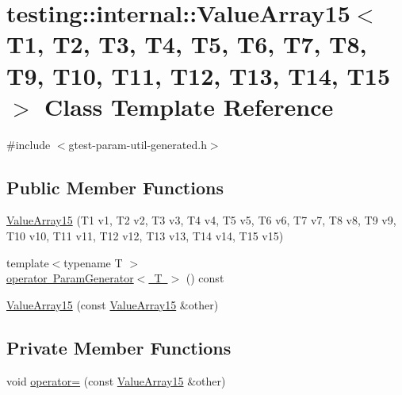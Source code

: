 \hypertarget{classtesting_1_1internal_1_1_value_array15}{}\section{testing\+::internal\+::Value\+Array15$<$ T1, T2, T3, T4, T5, T6, T7, T8, T9, T10, T11, T12, T13, T14, T15 $>$ Class Template Reference}
\label{classtesting_1_1internal_1_1_value_array15}


{\ttfamily \#include $<$gtest-\/param-\/util-\/generated.\+h$>$}

\subsection*{Public Member Functions}
\begin{DoxyCompactItemize}
\item 
\mbox{\hyperlink{classtesting_1_1internal_1_1_value_array15_a2f9c6670b744cb08587bea1b50e169b4}{Value\+Array15}} (T1 v1, T2 v2, T3 v3, T4 v4, T5 v5, T6 v6, T7 v7, T8 v8, T9 v9, T10 v10, T11 v11, T12 v12, T13 v13, T14 v14, T15 v15)
\item 
{\footnotesize template$<$typename T $>$ }\\\mbox{\hyperlink{classtesting_1_1internal_1_1_value_array15_ab5a77c335c83ef3f99e3133c2213c495}{operator Param\+Generator$<$ T $>$}} () const
\item 
\mbox{\hyperlink{classtesting_1_1internal_1_1_value_array15_ab08ee6de70a42bc580229cc32635fa5c}{Value\+Array15}} (const \mbox{\hyperlink{classtesting_1_1internal_1_1_value_array15}{Value\+Array15}} \&other)
\end{DoxyCompactItemize}
\subsection*{Private Member Functions}
\begin{DoxyCompactItemize}
\item 
void \mbox{\hyperlink{classtesting_1_1internal_1_1_value_array15_a58ef8574996963beeee69e2cb963509d}{operator=}} (const \mbox{\hyperlink{classtesting_1_1internal_1_1_value_array15}{Value\+Array15}} \&other)
\end{DoxyCompactItemize}
